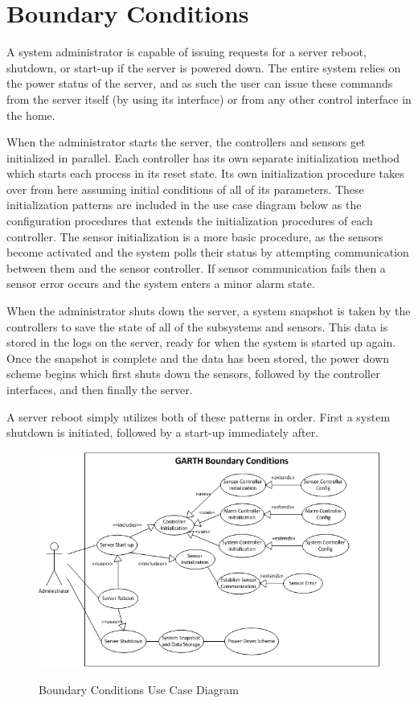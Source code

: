 \documentclass{report}
\begin{document}
\section{Boundary Conditions}

A system administrator is capable of issuing requests for a server reboot,
shutdown, or start-up if the server is powered down. The entire system relies
on the power status of the server, and as such the user can issue these
commands from the server itself (by using its interface) or from any other
control interface in the home.

When the administrator starts the server, the controllers and sensors get
initialized in parallel. Each controller has its own separate initialization
method which starts each process in its reset state. Its own initialization
procedure takes over from here assuming initial conditions of all of its
parameters. These initialization patterns are included in the use case diagram
below as the configuration procedures that extends the initialization
procedures of each controller. The sensor initialization is a more basic
procedure, as the sensors become activated and the system polls their status by
attempting communication between them and the sensor controller. If sensor
communication fails then a sensor error occurs and the system enters a minor
alarm state.

When the administrator shuts down the server, a system snapshot is taken by the
controllers to save the state of all of the subsystems and sensors. This data
is stored in the logs on the server, ready for when the system is started up
again. Once the snapshot is complete and the data has been stored, the power
down scheme begins which first shuts down the sensors, followed by the
controller interfaces, and then finally the server.

A server reboot simply utilizes both of these patterns in order. First a system
shutdown is initiated, followed by a start-up immediately after.

\begin{figure}[hp]
    \centering
        \caption{Boundary Conditions Use Case Diagram}
        \scriptsize
        \setlength{\unitlength}{2.0em}
        \includegraphics{boundary_conditions.png}
        \normalsize
    \label{fig:boundary_conditions}
\end{figure}
\end{document}
